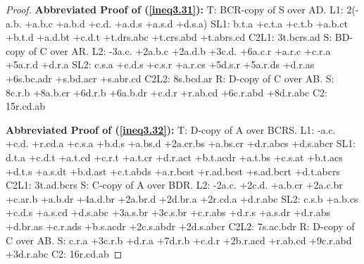 \documentclass[10pt,journal]{IEEEtran}
\begin{document}
\begin{proof}
{\bf Abbreviated Proof of (\ref{ineq3.31}):}
T: BCR-copy of S over AD.\newline
L1: 2(-a.b. +a.b.c +a.b.d +c.d. +a.d.s +a.s.d +d.s.a)\newline
SL1: b.t.a +c.t.a +c.t.b +a.b.ct +b.t.d +a.d.bt +c.d.t +t.drs.abc +t.crs.abd +t.abrs.cd
C2L1: 3t.bcrs.ad\newline
S: BD-copy of C over AR.\newline
L2: -3a.c. +2a.b.c +2a.d.b +3c.d. +6a.c.r +a.r.c +c.r.a +5a.r.d +d.r.a\newline
SL2: c.s.a +c.d.s +c.s.r +a.r.cs +5d.s.r +5a.r.ds +d.r.as +6s.bc.adr +s.bd.acr +s.abr.cd\newline
C2L2: 8s.bcd.ar\newline
R: D-copy of C over AB.\newline
S: 8c.r.b +8a.b.cr +6d.r.b +6a.b.dr +c.d.r +r.ab.cd +6c.r.abd +8d.r.abc\newline
C2: 15r.cd.ab\newline

{\bf Abbreviated Proof of (\ref{ineq3.32}):}
T: D-copy of A over BCRS.\newline
L1: -a.c. +c.d. +r.cd.a +c.s.a +b.d.s +a.bs.d +2a.cr.bs +a.bs.cr +d.r.abcs +d.s.abcr\newline
SL1: d.t.a +c.d.t +a.t.cd +c.r.t +a.t.cr +d.r.act +b.t.acdr +a.t.bs +c.s.at +b.t.acs +d.t.s +a.s.dt +b.d.ast +c.t.abds +a.r.bcst +r.ad.bcst +s.ad.bcrt +d.t.abcrs
C2L1: 3t.ad.bcrs\newline
S: C-copy of A over BDR.\newline
L2: -2a.c. +2c.d. +a.b.cr +2a.c.br +c.ar.b +a.b.dr +4a.d.br +2a.br.d +2d.br.a +2r.cd.a +d.r.abc\newline
SL2: c.s.b +a.b.cs +c.d.s +a.s.cd +d.s.abc +3a.s.br +3c.s.br +c.r.abs +d.r.s +a.s.dr +d.r.abs +d.br.as +c.r.ads +b.s.acdr +2c.s.abdr +2d.s.abcr\newline
C2L2: 7s.ac.bdr\newline
R: D-copy of C over AB.\newline
S: c.r.a +3c.r.b +d.r.a +7d.r.b +c.d.r +2b.r.acd +r.ab.cd +9c.r.abd +3d.r.abc\newline
C2: 16r.cd.ab\newline



\end{proof}
\end{document}
